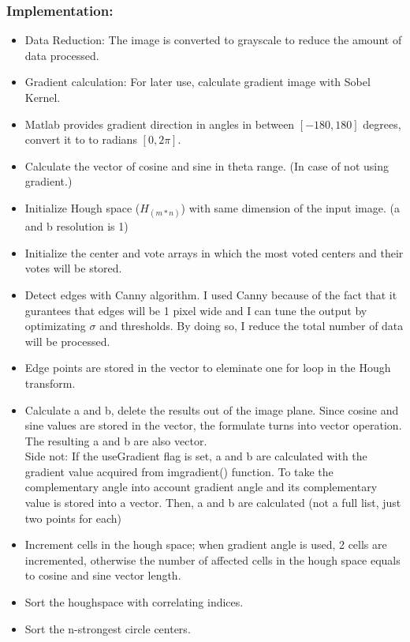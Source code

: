 \documentclass{article}
\begin{document}
	\subsubsection{Implementation:}
	\begin{itemize}
		\item Data Reduction: The image is converted to grayscale to reduce the amount
		of data processed.
		\item Gradient calculation: For later use, calculate gradient image with Sobel
		Kernel.
		\item Matlab provides gradient direction in angles in between $[-180, 180]$
		degrees, convert it to to radians $[0, 2\pi]$.
		\item Calculate the vector of cosine and sine in theta range. (In case of not
		using gradient.)
		\item Initialize Hough space ($H_{(m*n)}$) with same dimension of the input
		image.	(a and b resolution is 1) 
		\item Initialize the center and vote arrays in which the most voted centers
		and their votes will be stored.
		\item Detect edges with Canny algorithm. I used Canny because of the fact that
		it gurantees that edges will be 1 pixel wide and I can tune the output by
		optimizating $\sigma$ and thresholds.
		By doing so, I reduce the total number of data will be processed.
		\item Edge points are stored in the vector to eleminate one for loop in the
		Hough transform.
		\item Calculate a and b, delete the results out of the image plane.
		Since cosine and sine values are stored in the vector, the formulate turns
		into vector operation. The resulting a and b are also vector. \\
		Side not: If the useGradient flag is set, a and b are calculated with the
		gradient value acquired from imgradient() function. To take the complementary
		angle into account gradient angle and its complementary value is stored into a
		vector. Then, a and b are calculated (not a full list, just two points for
		each)
		\item Increment cells in the hough space; when gradient angle is used, 2 cells
		are incremented, otherwise the number of affected cells in the hough space
		equals to cosine and sine vector length.
		\item Sort the houghspace with correlating indices.
		\item Sort the n-strongest circle centers.
	\end{itemize}
	
\end{document}
